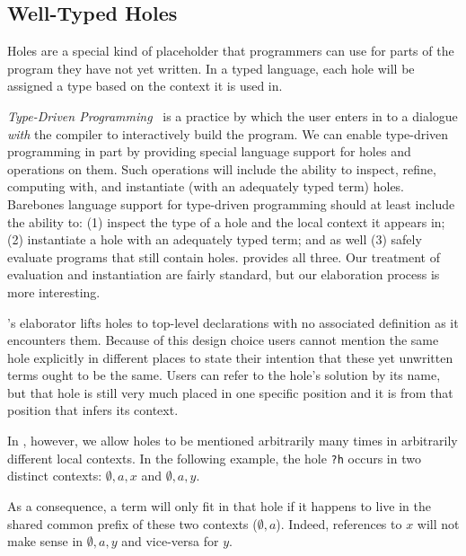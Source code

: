 \subsection{Well-Typed Holes}
\label{sec:design:holes}

Holes are a special kind of placeholder that programmers can use for parts of the program they have not yet written.
%
In a typed language, each hole will be assigned a type based on the context it is used in.

\emph{Type-Driven Programming}~\cite{DBLP:journals/pacmpl/OmarVCH19} is a practice by which the user enters in to a dialogue \emph{with} the compiler to interactively build the program.
We can enable type-driven programming in part by providing special language support for holes and operations on them.
Such operations will include the ability to inspect, refine, computing with, and instantiate (with an adequately typed term) holes.
%
Barebones language support for type-driven programming should at least include the ability to:
%
(1) inspect the type of a hole and the local context it appears in;
%
(2) instantiate a hole with an adequately typed term;
%
and as well
%
(3) safely evaluate programs that still contain holes.
%
\Velo{} provides all three.
%
Our treatment of evaluation and instantiation are fairly standard, but our elaboration process is more interesting.

\Idris{}'s elaborator lifts holes to top-level declarations with no associated definition as it encounters them.
%
Because of this design choice users cannot mention the same hole explicitly in different places to state their intention that these yet unwritten terms ought to be the same.
%
Users can refer to the hole's solution by its name, but that hole is still very much placed in one specific position and it is from that position that \Idris{} infers its context.

In \Velo{}, however, we allow holes to be mentioned arbitrarily many times in
arbitrarily different local contexts.
%
In the following example, the hole \texttt{?h} occurs in two distinct contexts: $\emptyset,a,x$ and $\emptyset,a,y$.

\begin{center}
  \holeexamplegraph{}
\end{center}

As a consequence, a term will only fit in that hole if it happens to live in the shared common prefix of these two contexts ($\emptyset,a$).
%
Indeed, references to $x$ will not make sense in $\emptyset,a,y$ and vice-versa for $y$.


